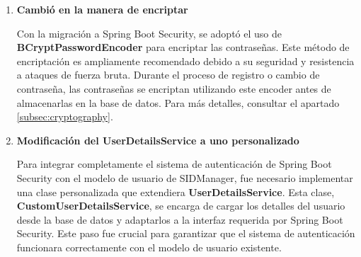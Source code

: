 \documentclass[draft]{scrbook}
\begin{document}
\begin{enumerate}
\begin{lstlisting}[language=Java]
    public CustomUserDetailsService(ClientUserRepository userRepository) {
        this.clientUserRepository = userRepository;
    }
    
    @Override
    public UserDetails loadUserByUsername(String username) throws UsernameNotFoundException {
        ClientUser user = clientUserRepository.findByEmail(username);
        
        if (user == null) {
            throw new UsernameNotFoundException("User not found");
        }
        
        CustomUserDetails customUserDetails = new CustomUserDetails(user);
        
        return customUserDetails;
    }
}
\end{lstlisting}

    \textbf{Explicación del código}
    \begin{itemize}
        \item \textbf{Carga del usuario}: El método \textbf{loadUserByUsername} busca al usuario en la base de datos utilizando su correo electrónico.
        \item \textbf{Adaptación al modelo}: La clase \textbf{CustomUserDetails} adapta el modelo de usuario de la aplicación (\textbf{ClientUser}) a la interfaz \textbf{UserDetails} requerida por Spring Boot Security.
        \item \textbf{Manejo de errores}: Si el usuario no se encuentra, se lanza una excepción \textbf{UsernameNotFoundException}.
    \end{itemize}

    \item \textbf{Cambió en la manera de encriptar}
    
    Con la migración a Spring Boot Security, se adoptó el uso de \textbf{BCryptPasswordEncoder} para encriptar las contraseñas. Este método de encriptación es ampliamente recomendado debido a su seguridad y resistencia a ataques de fuerza bruta. Durante el proceso de registro o cambio de contraseña, las contraseñas se encriptan utilizando este encoder antes de almacenarlas en la base de datos. Para más detalles, consultar el apartado \ref{subsec:cryptography}.

    \item \textbf{Modificación del UserDetailsService a uno personalizado}
    
    Para integrar completamente el sistema de autenticación de Spring Boot Security con el modelo de usuario de SIDManager, fue necesario implementar una clase personalizada que extendiera \textbf{UserDetailsService}. Esta clase, \textbf{CustomUserDetailsService}, se encarga de cargar los detalles del usuario desde la base de datos y adaptarlos a la interfaz requerida por Spring Boot Security. Este paso fue crucial para garantizar que el sistema de autenticación funcionara correctamente con el modelo de usuario existente.


\end{enumerate}
\end{document}
